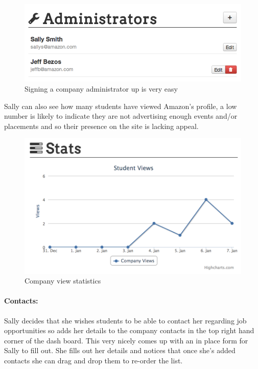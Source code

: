     \begin{figure}[H]\centering
    \includegraphics[scale=0.5]{images/user_experiences/company/jeff_admin}
    \caption{Signing a company administrator up is very easy}
    \end{figure}

    Sally can also see how many students have viewed Amazon's profile, a low number is likely to indicate they are not advertising enough events and/or placements and so their presence on the site is lacking appeal.

    \begin{figure}[H]\centering
    \includegraphics[scale=0.5]{images/user_experiences/company/stats}
    \caption{Company view statistics}
    \end{figure}

  \paragraph{Contacts:}
    Sally decides that she wishes students to be able to contact her regarding job opportunities so adds her details to the company contacts in the top right hand corner of the dash board. This very nicely comes up with an in place form for Sally to fill out.
    She fills out her details and notices that once she's added contacts she can drag and drop them to re-order the list.

